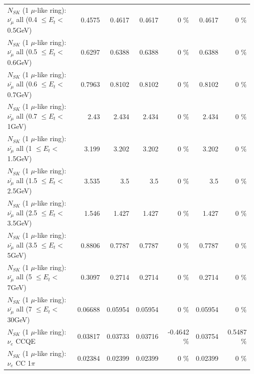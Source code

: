 \begin{table}
\begin{tabular}{| l | r | r | r  r | r  r |}
 $N_{SK}$ (1 $\mu$-like ring): $\bar{\nu_{\mu}}$ all (0.4 $\leq E_{t} <$ 0.5GeV) &          0.4575 &          0.4617 &          0.4617 &        0 \%  &          0.4617 &        0 \%  \\ 
 $N_{SK}$ (1 $\mu$-like ring): $\bar{\nu_{\mu}}$ all (0.5 $\leq E_{t} <$ 0.6GeV) &          0.6297 &          0.6388 &          0.6388 &        0 \%  &          0.6388 &        0 \%  \\ 
 $N_{SK}$ (1 $\mu$-like ring): $\bar{\nu_{\mu}}$ all (0.6 $\leq E_{t} <$ 0.7GeV) &          0.7963 &          0.8102 &          0.8102 &        0 \%  &          0.8102 &        0 \%  \\ 
   $N_{SK}$ (1 $\mu$-like ring): $\bar{\nu_{\mu}}$ all (0.7 $\leq E_{t} <$ 1GeV) &            2.43 &           2.434 &           2.434 &        0 \%  &           2.434 &        0 \%  \\ 
   $N_{SK}$ (1 $\mu$-like ring): $\bar{\nu_{\mu}}$ all (1 $\leq E_{t} <$ 1.5GeV) &           3.199 &           3.202 &           3.202 &        0 \%  &           3.202 &        0 \%  \\ 
 $N_{SK}$ (1 $\mu$-like ring): $\bar{\nu_{\mu}}$ all (1.5 $\leq E_{t} <$ 2.5GeV) &           3.535 &             3.5 &             3.5 &        0 \%  &             3.5 &        0 \%  \\ 
 $N_{SK}$ (1 $\mu$-like ring): $\bar{\nu_{\mu}}$ all (2.5 $\leq E_{t} <$ 3.5GeV) &           1.546 &           1.427 &           1.427 &        0 \%  &           1.427 &        0 \%  \\ 
   $N_{SK}$ (1 $\mu$-like ring): $\bar{\nu_{\mu}}$ all (3.5 $\leq E_{t} <$ 5GeV) &          0.8806 &          0.7787 &          0.7787 &        0 \%  &          0.7787 &        0 \%  \\ 
     $N_{SK}$ (1 $\mu$-like ring): $\bar{\nu_{\mu}}$ all (5 $\leq E_{t} <$ 7GeV) &          0.3097 &          0.2714 &          0.2714 &        0 \%  &          0.2714 &        0 \%  \\ 
    $N_{SK}$ (1 $\mu$-like ring): $\bar{\nu_{\mu}}$ all (7 $\leq E_{t} <$ 30GeV) &         0.06688 &         0.05954 &         0.05954 &        0 \%  &         0.05954 &        0 \%  \\ 
\hline
\hline
\hline
                                      $N_{SK}$ (1 $\mu$-like ring): $\nu_e$ CCQE &         0.03817 &         0.03733 &         0.03716 &  -0.4642 \%  &         0.03754 &   0.5487 \%  \\ 
                                 $N_{SK}$ (1 $\mu$-like ring): $\nu_e$ CC 1$\pi$ &         0.02384 &         0.02399 &         0.02399 &        0 \%  &         0.02399 &        0 \%  \\ 

\end{tabular}
\end{table}
